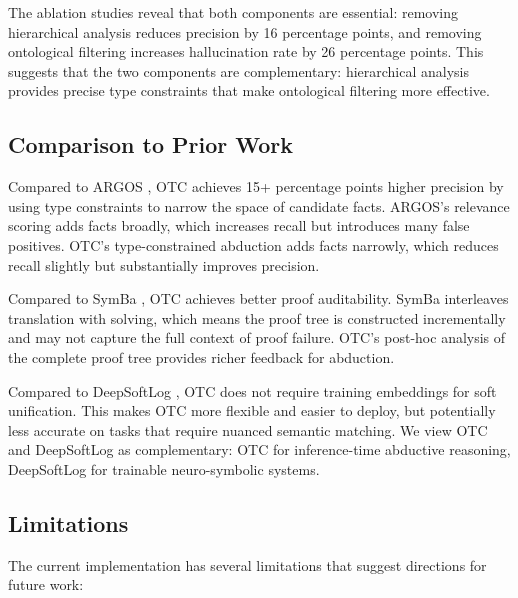 \documentclass[11pt,letterpaper]{article}
\begin{document}
The ablation studies reveal that both components are essential: removing hierarchical analysis reduces precision by 16 percentage points, and removing ontological filtering increases hallucination rate by 26 percentage points. This suggests that the two components are complementary: hierarchical analysis provides precise type constraints that make ontological filtering more effective.

\subsection{Comparison to Prior Work}

Compared to ARGOS \cite{Cotnareanu2025}, OTC achieves 15+ percentage points higher precision by using type constraints to narrow the space of candidate facts. ARGOS's relevance scoring adds facts broadly, which increases recall but introduces many false positives. OTC's type-constrained abduction adds facts narrowly, which reduces recall slightly but substantially improves precision.

Compared to SymBa \cite{Lee2024}, OTC achieves better proof auditability. SymBa interleaves translation with solving, which means the proof tree is constructed incrementally and may not capture the full context of proof failure. OTC's post-hoc analysis of the complete proof tree provides richer feedback for abduction.

Compared to DeepSoftLog \cite{Maene2023}, OTC does not require training embeddings for soft unification. This makes OTC more flexible and easier to deploy, but potentially less accurate on tasks that require nuanced semantic matching. We view OTC and DeepSoftLog as complementary: OTC for inference-time abductive reasoning, DeepSoftLog for trainable neuro-symbolic systems.

\subsection{Limitations}

The current implementation has several limitations that suggest directions for future work:
\end{document}
